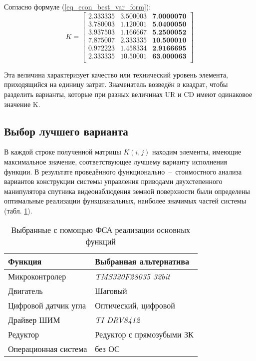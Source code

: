 Согласно формуле (\ref{eq_econ_best_var_form}):
\begin{equation}
    K =
        \begin{bmatrix}
            2.333335 & 3.500003 & \textbf{7.0000070} \\
            3.780003 & 1.120001 & \textbf{5.0400050} \\
            3.937503 & 1.166667 & \textbf{5.2500052} \\
            7.875007 & 2.333335 & \textbf{10.500010} \\
            0.972223 & 1.458334 & \textbf{2.9166695} \\
            2.333335 & 10.50001 & \textbf{63.000063} \\
        \end{bmatrix}
    \label{eq_econ_best_var}
\end{equation}

Эта величина характеризует качество или технический уровень
элемента, приходящийся на единицу затрат. Знаменатель возведён в квадрат,
чтобы разделить варианты, которые при разных величинах UR и CD имеют
одинаковое значение K.

\newpage
\subsection{Выбор лучшего варианта}
В каждой строке полученной матрицы $K(i, j)$ находим элементы,
имеющие максимальное значение, соответствующее лучшему варианту
исполнения функции.
В результате проведённого функционально~--~стоимостного анализа
вариантов конструкции системы управления приводами двухстепенного манипулятора
спутника видеонаблюдения земной поверхности были определены оптимальные
реализации функцианальных, наиболее значимых частей системы
(табл. \ref{tbl_econ_result}).

\begin{table}[ht]
    \centering
    \begin{tabular}{|l|l|}
        \hline
        Функция & Выбранная альтернатива \\
        \hline
        \hline
        Микроконтролер & \textit{TMS320F28035 32bit} \\
        \hline
        Двигатель & Шаговый \\
        \hline
        Цифровой датчик угла & Оптический, цифровой \\
        \hline
        Драйвер ШИМ & \textit{TI DRV8412} \\
        \hline
        Редуктор & Редуктор с прямозубыми ЗК \\
        \hline
        Операционная система & без ОС \\
        \hline
    \end{tabular}
    \caption{Выбранные с помощью ФСА реализации основных функций}
    \label{tbl_econ_result}
\end{table}

